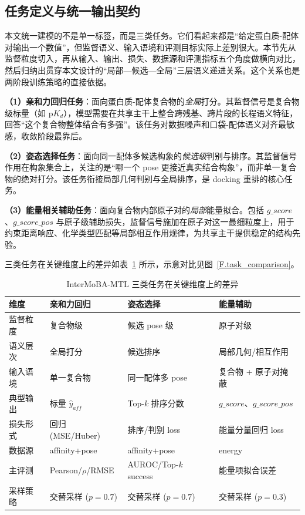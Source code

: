 \subsection{任务定义与统一输出契约}

本文统一建模的不是单一标签，而是三类任务。它们看起来都是“给定蛋白质-配体对输出一个数值”，但监督语义、输入语境和评测目标实际上差别很大。本节先从监督粒度切入，再从输入、输出、损失、数据源和评测指标五个角度做横向对比，然后归纳出贯穿本文设计的“局部—候选—全局”三层语义递进关系。这个关系也是两阶段训练策略的直接依据。

\textbf{（1）亲和力回归任务}：面向蛋白质-配体复合物的\emph{全局}打分。其监督信号是复合物级标量（如 $\mathrm{p}K_d$），模型需要在共享主干上整合跨残基、跨片段的长程语义特征，回答“这个复合物整体结合有多强”。该任务对数据噪声和口袋-配体语义对齐最敏感，收敛阶段最靠后。

\textbf{（2）姿态选择任务}：面向同一配体多候选构象的\emph{候选级}判别与排序。其监督信号作用在构象集合上，关注的是“哪一个 pose 更接近真实结合构象”，而非单一复合物的绝对打分。该任务衔接局部几何判别与全局排序，是 docking 重排的核心任务。

\textbf{（3）能量相关辅助任务}：面向复合物内部原子对的\emph{局部}能量拟合。包括 $g\_score$、$g\_score\_pos$ 与原子级辅助损失，监督信号施加在原子对这一最细粒度上，用于约束距离响应、化学类型匹配等局部相互作用规律，为共享主干提供稳定的结构先验。

三类任务在关键维度上的差异如表~\ref{T.task_comparison} 所示，示意对比见图~\ref{F.task_comparison}。

\begin{table}[hbt]
  \centering
  \caption{InterMoBA-MTL 三类任务在关键维度上的差异}
  \label{T.task_comparison}
  \small
  \begin{tabular}{llll}
    \toprule
    维度 & 亲和力回归 & 姿态选择 & 能量辅助 \\
    \midrule
    监督粒度 & 复合物级 & 候选 pose 级 & 原子对级 \\
    语义层次 & 全局打分 & 候选排序 & 局部几何/相互作用 \\
    输入语境 & 单一复合物 & 同一配体多 pose & 复合物 + 原子对掩蔽 \\
    典型输出 & 标量 $\hat{y}_{aff}$ & Top-$k$ 排序分数 & $g\_score$、$g\_score\_pos$ \\
    损失形式 & 回归 (MSE/Huber) & 排序/判别 loss & 能量分量回归 loss \\
    数据源 & affinity+pose & affinity+pose & energy \\
    主评测 & Pearson/$\rho$/RMSE & AUROC/Top-$k$ success & 能量项拟合误差 \\
    采样策略 & 交替采样 ($p=0.7$) & 交替采样 ($p=0.7$) & 交替采样 ($p=0.3$) \\
    \bottomrule
  \end{tabular}
\end{table}

